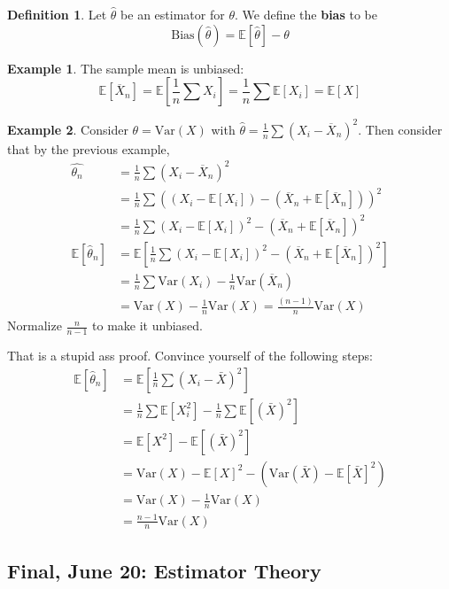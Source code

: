 \documentclass[10pt, oneside]{article}
\newcommand{\Var}{\text{Var}}
\newcommand{\bbE}{\mathbb{E}}
\theoremstyle{definition}
\newtheorem{exmp}{Example}[section]
\newtheorem{defn}{Definition}
\begin{document}
\begin{defn}
    Let $\hat{\theta}$ be an estimator for $\theta.$ We define the \textbf{bias} to be 
    \[\text{Bias}(\hat{\theta}) = \bbE[\hat{\theta}] - \theta\]
\end{defn}
\begin{exmp}
    The sample mean is unbiased: 
    \[\bbE[\overline{X}_n] = \bbE[\frac{1}{n}\sum X_i] = \frac{1}{n} \sum \bbE[X_i] = \bbE[X]\]
\end{exmp}
\begin{exmp}
    Consider $\theta = \Var (X)$ with $\hat{\theta} = \frac{1}{n}\sum (X_i - \overline{X}_n)^2.$ Then consider that by the previous example,
    \begin{align*}
        \hat{\theta_n} &= \frac{1}{n}\sum (X_i - \overline{X}_n)^2\\
        &= \frac{1}{n}\sum ((X_i - \bbE[X_i]) - (\overline{X}_n + \bbE[\overline{X}_n]))^2\\
        &= \frac{1}{n}\sum (X_i - \bbE[X_i])^2 - (\overline{X}_n + \bbE[\overline{X}_n])^2\\
        \bbE[\hat{\theta}_n] &= \bbE\left[\frac{1}{n}\sum (X_i - \bbE[X_i])^2 - (\overline{X}_n + \bbE[\overline{X}_n])^2\right]\\
        &= \frac{1}{n}\sum \Var(X_i) - \frac{1}{n}\Var(\overline{X}_n)\\
        &= \Var(X) - \frac{1}{n}\Var(X) = \frac{(n-1)}{n}\Var(X)
    \end{align*}
    Normalize $\frac{n}{n-1}$ to make it unbiased. 

    That is a stupid ass proof. Convince yourself of the following steps:
    \begin{align*}
        \bbE[\hat{\theta}_n] &= \bbE[\frac{1}{n} \sum (X_i - \bar X)^2]\\
        &= \frac{1}{n}\sum \bbE [X_i^2]- \frac{1}{n}\sum \bbE[(\bar X)^2]\\
        &= \bbE[X^2] - \bbE[(\bar X)^2]\\
        &= \Var (X) - \bbE[X]^2 - (\Var(\bar X) - \bbE[\bar X]^2)\\
        &= \Var (X) - \frac{1}{n}\Var(X)\\
        &= \frac{n-1}{n}\Var(X)
    \end{align*}
\end{exmp}

\newpage
\subsection{Final, June 20: Estimator Theory}
\end{document}
